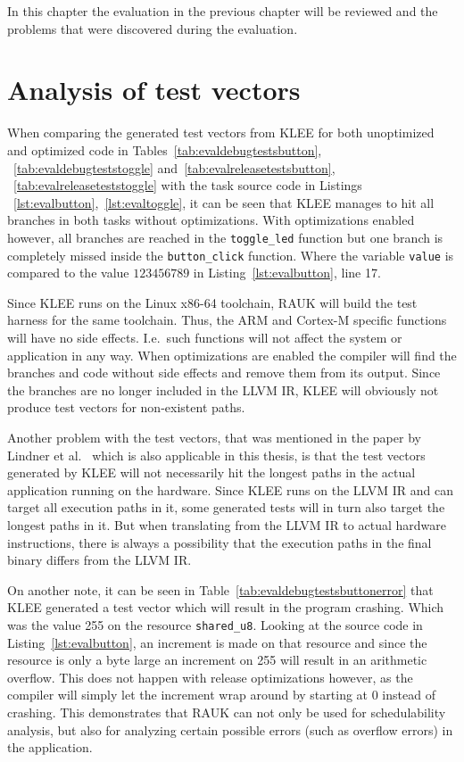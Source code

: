 In this chapter the evaluation in the previous chapter will be reviewed
and the problems that were discovered during the evaluation.

\section{Analysis of test vectors}
When comparing the generated test vectors from KLEE for both unoptimized and
optimized code in Tables~\ref{tab:evaldebugtestsbutton},
~\ref{tab:evaldebugteststoggle} and~\ref{tab:evalreleasetestsbutton},
~\ref{tab:evalreleaseteststoggle} with the task source code in Listings
~\ref{lst:evalbutton},~\ref{lst:evaltoggle}, it can be seen that KLEE manages to
hit all branches in both tasks without optimizations. With optimizations
enabled however, all branches are reached in the \texttt{toggle\_led} function
but one branch is completely missed inside the \texttt{button\_click} function.
Where the variable \texttt{value} is compared to the value $123456789$ in
Listing~\ref{lst:evalbutton}, line 17.

Since KLEE runs on the Linux x86-64 toolchain, RAUK will build the test harness
for the same toolchain. Thus, the ARM and Cortex-M specific functions will have
no side effects. I.e.\ such functions will not affect the system or application
in any way. When optimizations are enabled the compiler will find the branches
and code without side effects and remove them from its output. Since the
branches are no longer included in the LLVM IR, KLEE will obviously not
produce test vectors for non-existent paths.

Another problem with the test vectors, that was mentioned in the paper by
Lindner et al.\ \cite{lindner} which is also applicable in this thesis, is that
the test vectors generated by KLEE will not necessarily hit the longest paths
in the actual application running on the hardware. Since KLEE runs on the LLVM
IR and can target all execution paths in it, some generated tests will
in turn also target the longest paths in it. But when translating from the LLVM
IR to actual hardware instructions, there is always a possibility that the
execution paths in the final binary differs from the LLVM IR\@.

On another note, it can be seen in Table~\ref{tab:evaldebugtestsbuttonerror}
that KLEE generated a test vector which will result in the program crashing.
Which was the value 255 on the resource \texttt{shared\_u8}. Looking at the
source code in Listing~\ref{lst:evalbutton}, an increment is made on that
resource and since the resource is only a byte large an increment on 255 will
result in an arithmetic overflow. This does not happen with release
optimizations however, as the compiler will simply let the increment wrap
around by starting at 0 instead of crashing. This demonstrates that RAUK
can not only be used for schedulability analysis, but also for analyzing
certain possible errors (such as overflow errors) in the application.

